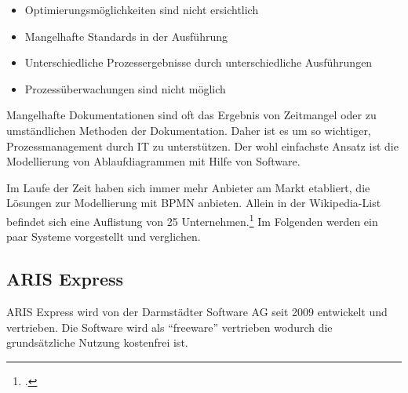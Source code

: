 \begin{itemize}
\item Optimierungsmöglichkeiten sind nicht ersichtlich
\item Mangelhafte Standards in der Ausführung
\item Unterschiedliche Prozessergebnisse durch unterschiedliche Ausführungen
\item Prozessüberwachungen sind nicht möglich
\end{itemize}

Mangelhafte Dokumentationen sind oft das Ergebnis von Zeitmangel oder zu
umständlichen Methoden der Dokumentation. Daher ist es um so wichtiger,
Prozessmanagement durch IT zu unterstützen. Der wohl einfachste Ansatz 
ist die Modellierung von Ablaufdiagrammen mit Hilfe von
Software.

Im Laufe der Zeit haben sich immer mehr Anbieter am Markt etabliert,
die Lösungen zur Modellierung mit BPMN anbieten. Allein in der Wikipedia-List
befindet sich eine Auflistung von 25 Unternehmen.\footcite{wikitools} Im
Folgenden werden ein paar Systeme vorgestellt und verglichen.

\subsection{ARIS Express}

ARIS Express wird von der Darmstädter Software AG seit 2009 entwickelt und
vertrieben. Die Software wird als "`freeware"' vertrieben wodurch die
grundsätzliche Nutzung kostenfrei ist.

